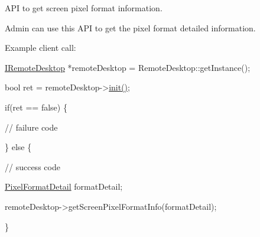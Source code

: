 \-A\-P\-I to get screen pixel format information. 

\-Admin can use this \-A\-P\-I to get the pixel format detailed information.

\-Example client call\-:


\begin{DoxyPre}\end{DoxyPre}



\begin{DoxyPre}  \hyperlink{classknoxremotedesktop_1_1IRemoteDesktop}{IRemoteDesktop} *remoteDesktop = RemoteDesktop::getInstance();\end{DoxyPre}



\begin{DoxyPre}  bool ret = remoteDesktop->\hyperlink{classknoxremotedesktop_1_1IRemoteDesktop_a7bed40d98c61713a69cf1dad8b37beae}{init()};\end{DoxyPre}



\begin{DoxyPre}  if(ret == false)  \{\end{DoxyPre}



\begin{DoxyPre}     // failure code\end{DoxyPre}



\begin{DoxyPre}  \} else \{\end{DoxyPre}



\begin{DoxyPre}     // success code\end{DoxyPre}



\begin{DoxyPre}     \hyperlink{structknoxremotedesktop_1_1PixelFormatDetail}{PixelFormatDetail} formatDetail;\end{DoxyPre}



\begin{DoxyPre}     remoteDesktop->getScreenPixelFormatInfo(formatDetail);\end{DoxyPre}



\begin{DoxyPre}  \}\end{DoxyPre}



